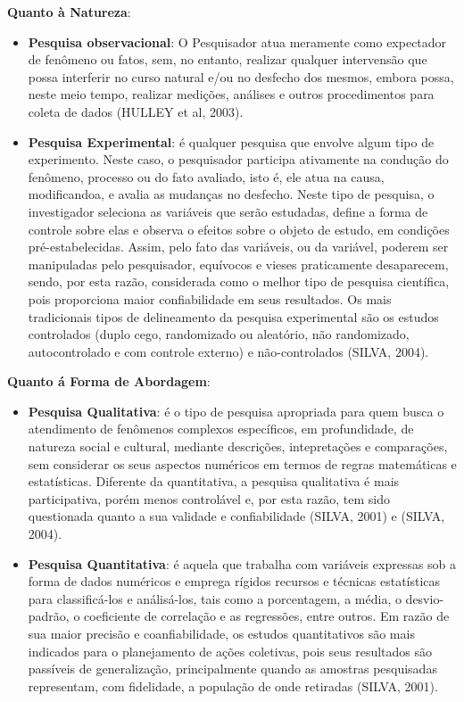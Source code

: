 \textbf{Quanto à Natureza}: 

\begin{itemize}
\item \textbf{Pesquisa observacional}: O Pesquisador atua meramente como expectador de fenômeno ou fatos, sem, no entanto, realizar qualquer intervensão que possa interferir no curso natural e/ou no desfecho dos mesmos, embora possa, neste meio tempo, realizar medições, análises e outros procedimentos para coleta de dados (HULLEY et al, 2003).
\item \textbf{Pesquisa Experimental}: é qualquer pesquisa que envolve algum tipo de experimento. Neste caso, o pesquisador participa ativamente na condução do fenômeno, processo ou do fato avaliado, isto é, ele atua na causa, modifican\-doa, e avalia as mudanças no desfecho. Neste tipo de pesquisa, o investigador seleciona as variáveis que serão estudadas, define a forma de controle sobre elas e observa o efeitos sobre o objeto de estudo, em condições pré-estabelecidas. Assim, pelo fato das variáveis, ou da variável, poderem ser manipuladas pelo pesquisador, equívocos e vieses praticamente  desaparecem, sendo, por esta razão, considerada como o melhor tipo de pesquisa científica, pois proporciona maior confiabilidade em seus resultados. Os mais tradicionais tipos de delineamento da pesquisa experimental são os estudos controlados (duplo cego, randomizado ou aleatório, não randomiza\-do, autocontrolado e com controle externo) e não-controlados (SILVA, 2004). 
\end{itemize}

\newpage
\textbf{Quanto á Forma de Abordagem}: 

\begin{itemize}
\item \textbf{Pesquisa Qualitativa}: é o tipo de pesquisa apropriada para quem busca o atendimento de fenômenos complexos específicos, em profundidade, de natureza social e cultural, mediante descrições, intepretações e comparações, sem considerar os seus aspectos numéricos em termos de regras matemáticas e estatísticas. Diferente da quantitativa, a pesquisa qualitativa é mais participativa, porém menos controlável e, por esta razão, tem sido questionada quanto a sua validade e confiabilidade (SILVA, 2001) e (SILVA, 2004).
\item \textbf{Pesquisa Quantitativa}: é aquela que trabalha com variáveis expressas sob a forma de dados numéricos e emprega rígidos recursos e técnicas estatísticas para classificá-los e análisá-los, tais como a porcentagem, a média, o desvio-padrão, o coeficiente de correlação e as regressões, entre outros. Em razão de sua maior precisão e coanfiabilidade, os estudos quantitativos são mais indicados para o planejamento de ações coletivas, pois seus resultados são passíveis de generalização, principalmente quando as amostras pesquisadas representam, com fidelidade, a população de onde retiradas (SILVA, 2001).
\end{itemize}

